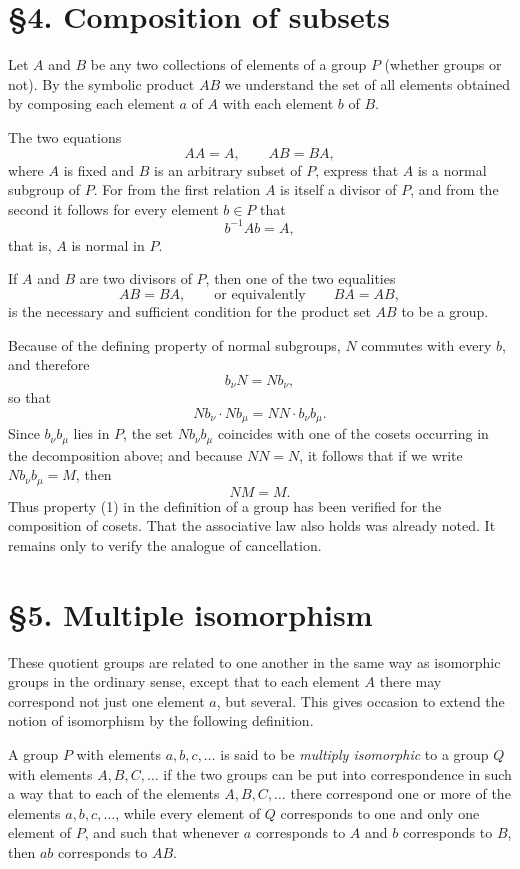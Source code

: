 \documentclass[11pt]{article}
\begin{document}
\section*{§4. Composition of subsets}
Let $A$ and $B$ be any two collections of elements of a group $P$ (whether groups or not). By the symbolic product $AB$ we understand the set of all elements obtained by composing each element $a$ of $A$ with each element $b$ of $B$.

The two equations
\[
 AA = A,
 \qquad
 AB = BA,
\]
where $A$ is fixed and $B$ is an arbitrary subset of $P$, express that $A$ is a normal subgroup of $P$. For from the first relation $A$ is itself a divisor of $P$, and from the second it follows for every element $b\in P$ that
\[
 b^{-1} A b = A,
\]
that is, $A$ is normal in $P$.

If $A$ and $B$ are two divisors of $P$, then one of the two equalities
\[
 AB = BA,
 \qquad\text{or equivalently}\qquad
 BA = AB,
\]
is the necessary and sufficient condition for the product set $AB$ to be a group.

Because of the defining property of normal subgroups, $N$ commutes with every $b$, and therefore
\[
 b_\nu N = N b_\nu,
\]
so that
\[
 N b_\nu \cdot N b_\mu = N N \cdot b_\nu b_\mu.
\]
Since $b_\nu b_\mu$ lies in $P$, the set $N b_\nu b_\mu$ coincides with one of the cosets occurring in the decomposition above; and because $N N = N$, it follows that if we write $N b_\nu b_\mu = M$, then
\[
 N M = M.
\]
Thus property (1) in the definition of a group has been verified for the composition of cosets. That the associative law also holds was already noted. It remains only to verify the analogue of cancellation.

\section*{§5. Multiple isomorphism}
These quotient groups are related to one another in the same way as isomorphic groups in the ordinary sense, except that to each element $A$ there may correspond not just one element $a$, but several. This gives occasion to extend the notion of isomorphism by the following definition.

A group $P$ with elements $a,b,c,\dots$ is said to be \emph{multiply isomorphic} to a group $Q$ with elements $A,B,C,\dots$ if the two groups can be put into correspondence in such a way that to each of the elements $A,B,C,\dots$ there correspond one or more of the elements $a,b,c,\dots$, while every element of $Q$ corresponds to one and only one element of $P$, and such that whenever $a$ corresponds to $A$ and $b$ corresponds to $B$, then $ab$ corresponds to $AB$.
\end{document}
